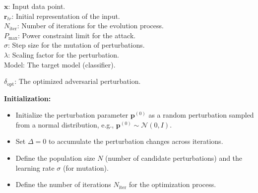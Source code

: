 
\(\mathbf{x}\): Input data point. \\
\(\mathbf{r}_{tr}\): Initial representation of the input. \\
\(N_{\text{iter}}\): Number of iterations for the evolution process. \\
\(P_{\text{max}}\): Power constraint limit for the attack. \\
\(\sigma\): Step size for the mutation of perturbations. \\
\(\lambda\): Scaling factor for the perturbation. \\
Model: The target model (classifier).

\(\delta_{\text{opt}}\): The optimized adversarial perturbation.

\textbf{Initialization:}
\begin{itemize}
    \item Initialize the perturbation parameter \(\mathbf{p}^{(0)}\) as a random perturbation sampled from a normal distribution, e.g., \( \mathbf{p}^{(0)} \sim \mathcal{N}(0, I) \).
    \item Set \(\Delta = 0\) to accumulate the perturbation changes across iterations.
    \item Define the population size \(N\) (number of candidate perturbations) and the learning rate \(\sigma\) (for mutation).
    \item Define the number of iterations \(N_{\text{iter}}\) for the optimization process.
\end{itemize}

